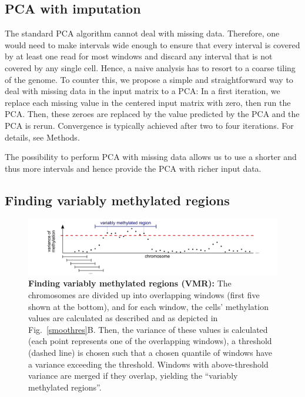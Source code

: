 \documentclass[twocolumn,10pt]{article}
\begin{document}
\subsection{PCA with imputation}

The standard PCA algorithm cannot deal with missing data. Therefore, one would need to make intervals wide enough to ensure that every interval is covered by at least one read for most windows and discard any interval that is not covered by any single cell. Hence, a naive analysis has to resort to a coarse tiling of the genome. To counter this, we propose a simple and straightforward way to deal with missing data in the input matrix to a PCA: In a first iteration, we replace each missing value in the centered input matrix with zero, then run the PCA. Then, these zeroes are replaced by the value predicted by the PCA and the PCA is rerun. Convergence is typically achieved after two to four iterations. For details, see Methods. 

The possibility to perform PCA with missing data allows us to use a shorter and thus more intervals and hence provide the PCA with richer input data.

\subsection{Finding variably methylated regions}

\begin{figure}
	\includegraphics[width=\columnwidth]{figures/Fig_sliding.png}
	\caption{\small \textbf{Finding variably methylated regions (VMR):} The chromosomes are divided up into overlapping windows (first five shown at the bottom), and for each window, the cells' methylation values are calculated as described and as depicted in Fig.\ \ref{smoothres}B. Then, the variance of these values is calculated (each point represents one of the overlapping windows), a threshold (dashed line) is chosen such that a chosen quantile of windows have a variance exceeding the threshold. Windows with above-threshold variance are merged if they overlap, yielding the ``variably methylated regions''.}
	\label{vmr}
\end{figure}
\end{document}
